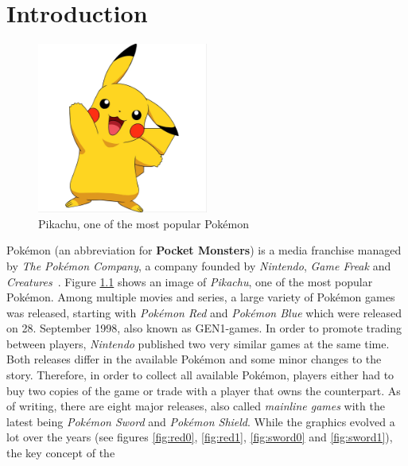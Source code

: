 
\chapter{Introduction}
\label{ch:introduction}

\begin{figure}
    \begin{center}
      \includegraphics[width=0.5\textwidth]{images/pikachu.png}
    \end{center}
    \caption{Pikachu, one of the most popular Pokémon~\autocite{Fandom:AshsPikachu}}
    \label{fig:pikachu-image}
\end{figure}
Pokémon (an abbreviation for \textbf{Pocket Monsters}) is a media franchise managed by \textit{The Pokémon Company}, a company
founded by \textit{Nintendo}, \textit{Game Freak} and \textit{Creatures}~\autocite{Wikipedia:Pokemon}. Figure \ref{fig:pikachu-image} shows an image of
\textit{Pikachu}, one of the most popular Pokémon. Among multiple movies and series, a large variety of Pokémon games was released, starting with
\textit{Pokémon Red} and \textit{Pokémon Blue} which were released on 28. September 1998, also known as \ac{GEN1}-games. In order to promote
trading between players, \textit{Nintendo} published two very similar games at the same time. 
Both releases differ in the available Pokémon and some minor changes to the story. Therefore, in order to collect all available Pokémon,
players either had to buy two copies of the game or trade with a player that owns the counterpart. As of writing, there are eight major
releases, also called \textit{mainline games} with the latest being \textit{Pokémon Sword} and \textit{Pokémon Shield}. While the graphics
evolved a lot over the years (see figures \ref{fig:red0}, \ref{fig:red1}, \ref{fig:sword0} and \ref{fig:sword1}), the key concept of the 
